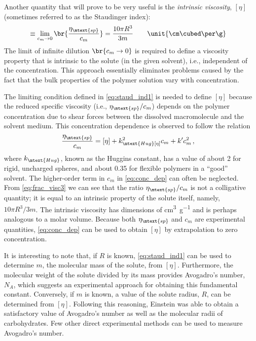 \documentclass[nobib,nofonts,nols,nohyper]{tufte-handout}
\begin{document}
Another quantity that will prove to be very useful is the \emph{intrinsic viscosity}, \( [\eta] \) (sometimes referred to as the Staudinger index):
\begin{equation}
	[\eta] \equiv \lim_{c_m \to 0}\br{\frac{\eta_\mtext{sp}}{c_m}} = \frac{10\pi R^3}{3 m} \qquad \unit{\cm\cubed \per \g}
	\label{eq:staud_ind1}
\end{equation}
The limit of infinite dilution \( \br{ c_m \to 0} \) is required to define a viscosity property that is intrinsic to the solute (in the given solvent), i.e., independent of the concentration. 
This approach essentially eliminates problems caused by the fact that the bulk properties of the polymer solution vary with concentration. 

The limiting condition defined in \cref{eq:staud_ind1} is needed to define \( [\eta] \) because the reduced specific viscosity (i.e., \( \eta_\mtext{sp}/c_m \)) depends on the polymer concentration due to shear forces between the dissolved macromolecule and the solvent medium. 
This concentration dependence is observed to follow the relation
\begin{equation}
	\frac{\eta_\mtext{sp}}{c_m} = [\eta] + k_\mtext{Hug} [\eta]^2 c_m + k' c_m^2 \, ,
	\label{eq:conc_dep}
\end{equation}
where \( k_\mtext{Hug} \), known as the Huggins constant, has a value of about \num{2} for rigid, uncharged spheres, and about \num{0.35} for flexible polymers in a ``good'' solvent.\autocite{tanford61} 
The higher-order term in \( c_m \) in \cref{eq:conc_dep} can often be neglected. 
From \cref{eq:frac_visc3} we can see that the ratio \( \eta_\mtext{sp}/c_m \) is not a colligative quantity; it is equal to an intrinsic property of the solute itself, namely, \( 10 \pi R^3 / 3 m \). 
The intrinsic viscosity has dimensions of \unit{\cm\cubed \per\g} and is perhaps analogous to a molar volume. 
Because both \( \eta_\mtext{sp} \) and \( c_m \) are experimental quantities, \cref{eq:conc_dep} can be used to obtain \( [\eta] \) by extrapolation to zero concentration.

It is interesting to note that, if \( R \) is known, \cref{eq:staud_ind1} can be used to determine \( m \), the molecular mass of the solute, from \( [\eta] \). 
Furthermore, the molecular weight of the solute divided by its mass provides Avogadro's number, \( N_A \), which suggests an experimental approach for obtaining this fundamental constant. 
Conversely, if \( m \) is known, a value of the solute radius, \( R \), can be determined from \( [\eta] \). 
Following this reasoning, Einstein was able to obtain a satisfactory value of Avogadro's number as well as the molecular radii of carbohydrates. 
Few other direct experimental methods can be used to measure Avogadro's number.
\end{document}
